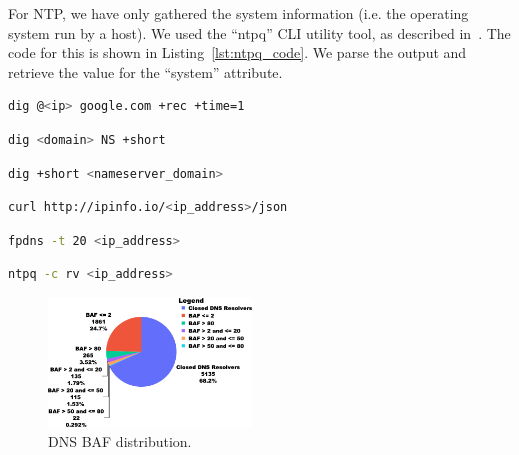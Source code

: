 For NTP, we have only gathered the system information (i.e. the operating system run by a host). We used the ``ntpq'' CLI utility tool, as described in~\cite{ntpq}. The code for this is shown in Listing~\ref{lst:ntpq_code}. We parse the output and retrieve the value for the ``system'' attribute. 

\lstset{style=shellstyle}

\begin{lstlisting}[language=bash, caption=Resolve the IP of google.com recursively, label=lst:check_recursive]
dig @<ip> google.com +rec +time=1
\end{lstlisting}


\begin{lstlisting}[language=bash, caption=Finds the authoritative nameservers of the placeholder domain. , label=lst:ns_dig]
dig <domain> NS +short
\end{lstlisting}


\begin{lstlisting}[language=bash, caption=Resolve the IP address of the authoritative nameserver domain. , label=lst:ns_find_ip]
dig +short <nameserver_domain>
\end{lstlisting}

\begin{lstlisting}[language=bash, caption=Find geolocation information about placeholder IP. , label=lst:ip_geoloc]
curl http://ipinfo.io/<ip_address>/json
\end{lstlisting}

\begin{lstlisting}[language=bash, caption=Find DNS software information about the placeholder host. , label=lst:fpdns_code]
fpdns -t 20 <ip_address>
\end{lstlisting}

\begin{lstlisting}[language=bash, caption=Find operating system ran by NTP host. , label=lst:ntpq_code]
ntpq -c rv <ip_address>
\end{lstlisting}


\begin{figure}[t]
    \centering
        \centering
        \includegraphics[width=0.48\textwidth]{research paper/plots/dns_sl_piechart_trim.png}
        \caption{DNS BAF distribution.}
        \label{fig:piechart_dns}
\end{figure}

